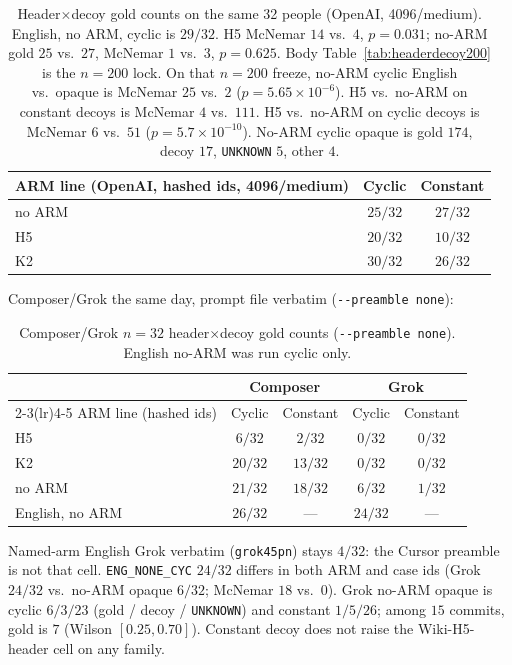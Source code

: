 \documentclass{article}
\begin{document}
\begin{table}[h]
\centering
\small
\begin{tabular}{@{}lcc@{}}
\toprule
ARM line (OpenAI, hashed ids, 4096/medium) & Cyclic & Constant \\
\midrule
no ARM & $25/32$ & $27/32$ \\
H5 & $20/32$ & $10/32$ \\
K2 & $30/32$ & $26/32$ \\
\bottomrule
\end{tabular}
\caption{Header$\times$decoy gold counts on the same 32 people
(OpenAI, 4096/medium).
English, no ARM, cyclic is $29/32$. H5 McNemar $14$ vs.\ $4$, $p{=}0.031$;
no-ARM gold $25$ vs.\ $27$, McNemar $1$ vs.\ $3$, $p{=}0.625$.
Body Table~\ref{tab:headerdecoy200} is the $n{=}200$ lock.
On that $n{=}200$ freeze, no-ARM cyclic English vs.\ opaque is McNemar $25$ vs.\ $2$
($p{=}5.65{\times}10^{-6}$).
H5 vs.\ no-ARM on constant decoys is McNemar $4$ vs.\ $111$.
H5 vs.\ no-ARM on cyclic decoys is McNemar $6$ vs.\ $51$
($p{=}5.7{\times}10^{-10}$).
No-ARM cyclic opaque is gold $174$, decoy $17$, \texttt{UNKNOWN} $5$,
other $4$.}
\label{tab:headerdecoy}
\end{table}

Composer/Grok the same day, prompt file verbatim (\texttt{{-}-preamble none}):

\begin{table}[ht]
\centering
\small
\setlength{\tabcolsep}{4pt}
\begin{tabular}{@{}lcccc@{}}
\toprule
& \multicolumn{2}{c}{Composer} & \multicolumn{2}{c}{Grok} \\
\cmidrule(lr){2-3}\cmidrule(lr){4-5}
ARM line (hashed ids) & Cyclic & Constant & Cyclic & Constant \\
\midrule
H5 & $6/32$ & $2/32$ & $0/32$ & $0/32$ \\
K2 & $20/32$ & $13/32$ & $0/32$ & $0/32$ \\
no ARM & $21/32$ & $18/32$ & $6/32$ & $1/32$ \\
English, no ARM & $26/32$ & --- & $24/32$ & --- \\
\bottomrule
\end{tabular}
\caption{Composer/Grok $n{=}32$ header$\times$decoy gold counts
(\texttt{{-}-preamble none}). English no-ARM was run cyclic only.}
\label{tab:headerdecoy-sdk}
\end{table}

Named-arm English Grok verbatim (\texttt{grok45pn}) stays $4/32$: the
Cursor preamble is not that cell.
\texttt{ENG\_NONE\_CYC} $24/32$ differs in both ARM and case ids
(Grok $24/32$ vs.\ no-ARM opaque $6/32$; McNemar $18$ vs.\ $0$).
Grok no-ARM opaque is cyclic $6/3/23$ (gold / decoy / \texttt{UNKNOWN})
and constant $1/5/26$; among $15$ commits, gold is $7$
(Wilson $[0.25,0.70]$).
Constant decoy does not raise the Wiki-H5-header cell on any family.
\FloatBarrier
\end{document}
